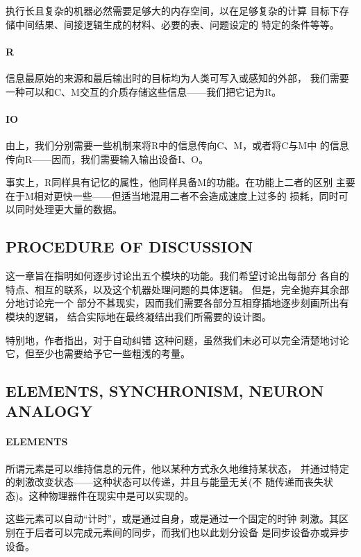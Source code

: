 \documentclass[UTF8]{ctexart}
\begin{document}
执行长且复杂的机器必然需要足够大的内存空间，以在足够复杂的计算
目标下存储中间结果、间接逻辑生成的材料、必要的表、问题设定的
特定的条件等等。

\paragraph{R}

信息最原始的来源和最后输出时的目标均为人类可写入或感知的外部，
我们需要一种可以和C、M交互的介质存储这些信息——我们把它记为R。

\paragraph{IO}

由上，我们分别需要一些机制来将R中的信息传向C、M，或者将C与M中
的信息传向R——因而，我们需要输入输出设备I、O。

事实上，R同样具有记忆的属性，他同样具备M的功能。在功能上二者的区别
主要在于M相对更快一些——但适当地混用二者不会造成速度上过多的
损耗，同时可以同时处理更大量的数据。

\subsection{PROCEDURE OF DISCUSSION}

这一章旨在指明如何逐步讨论出五个模块的功能。我们希望讨论出每部分
各自的特点、相互的联系，以及这个机器处理问题的具体逻辑。
但是，完全抛弃其余部分地讨论完一个
部分不甚现实，因而我们需要各部分互相穿插地逐步刻画所出有模块的逻辑，
结合实际地在最终凝结出我们所需要的设计图。

特别地，作者指出，对于自动纠错
这种问题，虽然我们未必可以完全清楚地讨论它，但至少也需要给予它一些粗浅的考量。

\subsection{ELEMENTS, SYNCHRONISM, NEURON ANALOGY}

\paragraph*{ELEMENTS}

所谓元素是可以维持信息的元件，他以某种方式永久地维持某状态，
并通过特定的刺激改变状态——这种状态可以传递，并且与能量无关(不
随传递而丧失状态)。这种物理器件在现实中是可以实现的。

这些元素可以自动“计时”，或是通过自身，或是通过一个固定的时钟
刺激。其区别在于后者可以完成元素间的同步，而我们也以此划分设备
是同步设备亦或异步设备。
\end{document}
